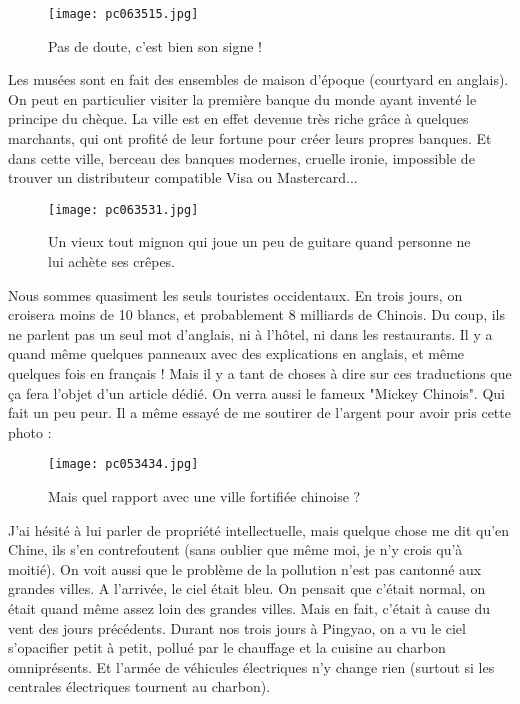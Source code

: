 \documentclass{book}
\begin{document}
\begin{figure}[h]
\centering
\texttt{[image: pc063515.jpg]}
\caption*{Pas de doute, c'est bien son signe !}
\end{figure}

Les musées sont en fait des ensembles de maison d'époque (courtyard en anglais). On peut en particulier visiter la première banque du monde ayant inventé le principe du chèque. La ville est en effet devenue très riche grâce à quelques marchants, qui ont profité de leur fortune pour créer leurs propres banques. Et dans cette ville, berceau des banques modernes, cruelle ironie, impossible de trouver un distributeur compatible Visa ou Mastercard...


\begin{figure}[h]
\centering
\texttt{[image: pc063531.jpg]}
\caption*{Un vieux tout mignon qui joue un peu de guitare quand personne ne lui achète ses crêpes.}
\end{figure}

Nous sommes quasiment les seuls touristes occidentaux. En trois jours, on croisera moins de 10 blancs, et probablement 8 milliards de Chinois. Du coup, ils ne parlent pas un seul mot d'anglais, ni à l'hôtel, ni dans les restaurants. Il y a quand même quelques panneaux avec des explications en anglais, et même quelques fois en français ! Mais il y a tant de choses à dire sur ces traductions que ça fera l'objet d'un article dédié.
On verra aussi le fameux "Mickey Chinois". Qui fait un peu peur. Il a même essayé de me soutirer de l'argent pour avoir pris cette photo :


\begin{figure}[h]
\centering
\texttt{[image: pc053434.jpg]}
\caption*{Mais quel rapport avec une ville fortifiée chinoise ?}
\end{figure}

J'ai hésité à lui parler de propriété intellectuelle, mais quelque chose me dit qu'en Chine, ils s'en contrefoutent (sans oublier que même moi, je n'y crois qu'à moitié).
On voit aussi que le problème de la pollution n'est pas cantonné aux grandes villes. A l'arrivée, le ciel était bleu. On pensait que c'était normal, on était quand même assez loin des grandes villes. Mais en fait, c'était à cause du vent des jours précédents. Durant nos trois jours à Pingyao, on a vu le ciel s’opacifier petit à petit, pollué par le chauffage et la cuisine au charbon omniprésents. Et l'armée de véhicules électriques n'y change rien (surtout si les centrales électriques tournent au charbon).
\end{document}
